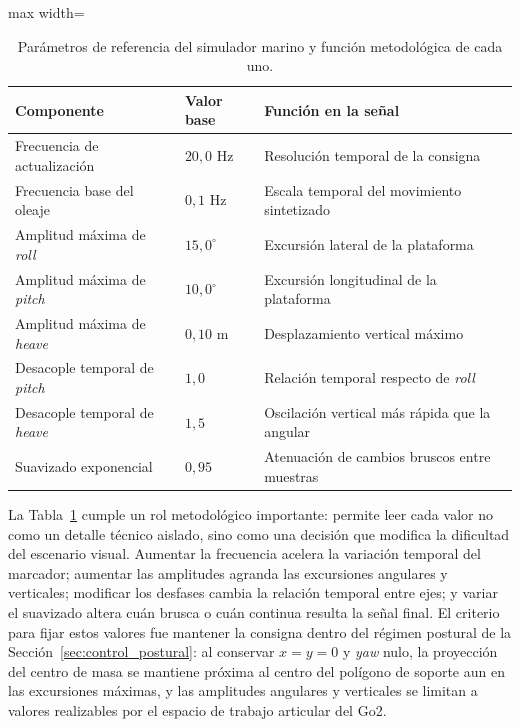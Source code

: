 \documentclass[12pt,a4paper]{report}
\begin{document}
\begin{table}[H]
\centering
\caption{Parámetros de referencia del simulador marino y función metodológica de
cada uno.}
\label{tab:method_marine_params}
\begin{adjustbox}{max width=\textwidth}
\begin{tabular}{lll}
\toprule
Componente & Valor base & Función en la señal \\
\midrule
Frecuencia de actualización & \(20{,}0\) Hz & Resolución temporal de la consigna \\
Frecuencia base del oleaje & \(0{,}1\) Hz & Escala temporal del movimiento sintetizado \\
Amplitud máxima de \emph{roll} & \(15{,}0^\circ\) & Excursión lateral de la plataforma \\
Amplitud máxima de \emph{pitch} & \(10{,}0^\circ\) & Excursión longitudinal de la plataforma \\
Amplitud máxima de \emph{heave} & \(0{,}10\) m & Desplazamiento vertical máximo \\
Desacople temporal de \emph{pitch} & \(1{,}0\) & Relación temporal respecto de \emph{roll} \\
Desacople temporal de \emph{heave} & \(1{,}5\) & Oscilación vertical más rápida que la angular \\
Suavizado exponencial & \(0{,}95\) & Atenuación de cambios bruscos entre muestras \\
\bottomrule
\end{tabular}
\end{adjustbox}
\end{table}

La Tabla~\ref{tab:method_marine_params} cumple un rol metodológico importante:
permite leer cada valor no como un detalle técnico aislado, sino como una
decisión que modifica la dificultad del escenario visual. Aumentar la frecuencia
acelera la variación temporal del marcador; aumentar las amplitudes agranda las
excursiones angulares y verticales; modificar los desfases cambia la relación
temporal entre ejes; y variar el suavizado altera cuán brusca o cuán continua
resulta la señal final. El criterio para fijar estos valores fue mantener la
consigna dentro del régimen postural de la
Sección~\ref{sec:control_postural}: al conservar \(x=y=0\) y \emph{yaw} nulo,
la proyección del centro de masa se mantiene próxima al centro del polígono de
soporte aun en las excursiones máximas, y las amplitudes angulares y verticales
se limitan a valores realizables por el espacio de trabajo articular del Go2.
\end{document}
